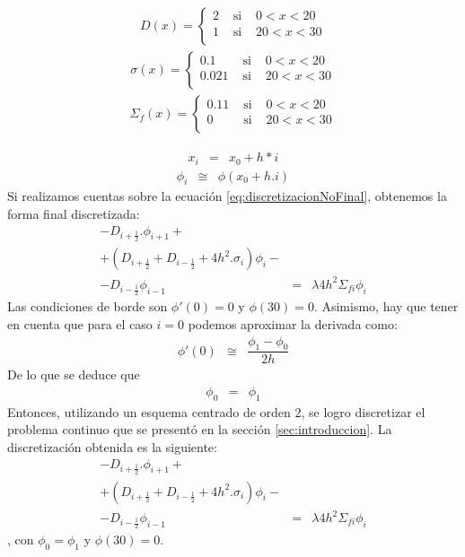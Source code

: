 \documentclass[11pt,a4paper]{emulateapj}
\begin{document}
\begin{eqnarray}
	D(x)=\left\{
		\begin{matrix}
			2 &\mbox{ si }& 0 < x < 20\\
			1 & \mbox{ si }& 20 < x < 30\\
		\end{matrix} \right.
\end{eqnarray}
\begin{eqnarray}
	\sigma(x)=\left\{
		\begin{matrix}
			0.1 &\mbox{ si }& 0 < x < 20\\
			0.021 & \mbox{ si }& 20 < x < 30\\
		\end{matrix} \right.
\end{eqnarray}
\begin{eqnarray}
	\Sigma_f(x)=\left\{
		\begin{matrix}
			0.11 &\mbox{ si }& 0 < x < 20\\
			0 & \mbox{ si }& 20 < x < 30\\
		\end{matrix} \right.
\end{eqnarray}

\begin{eqnarray}
	x_i &=&x_0 + h*i
\end{eqnarray}
\begin{eqnarray}
	\phi_i &\cong&\phi(x_0 + h.i)
\end{eqnarray}
Si realizamos cuentas sobre la ecuación \ref{eq:discretizacionNoFinal}, obtenemos la forma final discretizada:
\begin{eqnarray}
	-D_{i+\frac{1}{2}}.\phi_{i+1} + \\
	+(D_{i+\frac{1}{2}} + D_{i-\frac{1}{2}} + 4h^2.\sigma_i)\phi_{i} - \\
	-D_{i-\frac{1}{2}}\phi_{i-1} &=& \lambda 4h^2 \Sigma_{fi} \phi_i
\end{eqnarray}
Las condiciones de borde son $\phi'(0) = 0$ y $\phi(30) = 0$. Asimismo, hay que tener en cuenta que para el caso $i = 0$ podemos aproximar la derivada como:
\begin{eqnarray}
	\phi'(0) &\cong & \dfrac{\phi_1 - \phi_0}{2h}
\end{eqnarray}
De lo que se deduce que
\begin{eqnarray}
	\phi_0 &=& \phi_1
\end{eqnarray}
Entonces, utilizando un esquema centrado de orden 2, se logro discretizar el problema continuo que se presentó en la sección \ref{sec:introduccion}. La discretización obtenida es la siguiente:
\begin{eqnarray}
	-D_{i+\frac{1}{2}}.\phi_{i+1} + \\
	+(D_{i+\frac{1}{2}} + D_{i-\frac{1}{2}} + 4h^2.\sigma_i)\phi_{i} - \\
	-D_{i-\frac{1}{2}}\phi_{i-1} &=& \lambda 4h^2 \Sigma_{fi} \phi_i
\end{eqnarray}
, con $\phi_0 = \phi_1$ y $\phi(30) = 0$.
\end{document}
